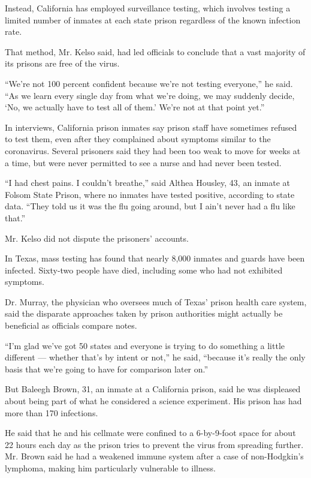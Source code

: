 Instead, California has employed surveillance testing, which involves
testing a limited number of inmates at each state prison regardless of
the known infection rate.

That method, Mr. Kelso said, had led officials to conclude that a vast
majority of its prisons are free of the virus.

``We're not 100 percent confident because we're not testing everyone,''
he said. ``As we learn every single day from what we're doing, we may
suddenly decide, `No, we actually have to test all of them.' We're not
at that point yet.''

In interviews, California prison inmates say prison staff have sometimes
refused to test them, even after they complained about symptoms similar
to the coronavirus. Several prisoners said they had been too weak to
move for weeks at a time, but were never permitted to see a nurse and
had never been tested.

``I had chest pains. I couldn't breathe,'' said Althea Housley, 43, an
inmate at Folsom State Prison, where no inmates have tested positive,
according to state data. ``They told us it was the flu going around, but
I ain't never had a flu like that.''

Mr. Kelso did not dispute the prisoners' accounts.

In Texas, mass testing has found that nearly 8,000 inmates and guards
have been infected. Sixty-two people have died, including some who had
not exhibited symptoms.

Dr. Murray, the physician who oversees much of Texas' prison health care
system, said the disparate approaches taken by prison authorities might
actually be beneficial as officials compare notes.

``I'm glad we've got 50 states and everyone is trying to do something a
little different --- whether that's by intent or not,'' he said,
``because it's really the only basis that we're going to have for
comparison later on.''

But Baleegh Brown, 31, an inmate at a California prison, said he was
displeased about being part of what he considered a science experiment.
His prison has had more than 170 infections.

He said that he and his cellmate were confined to a 6-by-9-foot space
for about 22 hours each day as the prison tries to prevent the virus
from spreading further. Mr. Brown said he had a weakened immune system
after a case of non-Hodgkin's lymphoma, making him particularly
vulnerable to illness.

